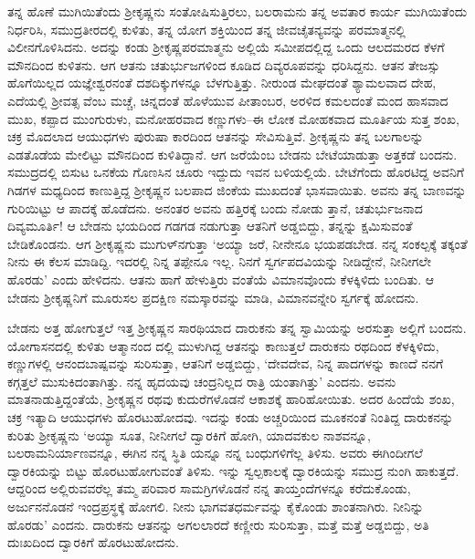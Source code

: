 ತನ್ನ ಹೊಣೆ ಮುಗಿಯಿತೆಂದು ಶ್ರೀಕೃಷ್ಣನು ಸಂತೋಷಿಸುತ್ತಿರಲು, ಬಲರಾಮನು ತನ್ನ ಅವತಾರ ಕಾರ್ಯ ಮುಗಿಯಿತೆಂದು ನಿರ್ಧರಿಸಿ, ಸಮುದ್ರತೀರದಲ್ಲಿ ಕುಳಿತು, ತನ್ನ ಯೋಗ ಶಕ್ತಿಯಿಂದ ತನ್ನ ಜೀವಚೈತನ್ಯವನ್ನು ಪರಮಾತ್ಮನಲ್ಲಿ ವಿಲೀನಗೊಳಿಸಿದನು. ಅದನ್ನು ಕಂಡು ಶ್ರೀಕೃಷ್ಣಪರಮಾತ್ಮನು ಅಲ್ಲಿಯೆ ಸಮೀಪದಲ್ಲಿದ್ದ ಒಂದು ಆಲದಮರದ ಕೆಳಗೆ ಮೌನದಿಂದ ಕುಳಿತನು. ಆಗ ಆತನು ಚತುರ್ಭುಜಗಳಿಂದ ಕೂಡಿದ ದಿವ್ಯರೂಪವನ್ನು ಧರಿಸಿದ್ದನು. ಆತನ ತೇಜಸ್ಸು ಹೊಗೆಯಿಲ್ಲದ ಯಜ್ಞೇಶ್ವರನಂತೆ ದಶದಿಕ್ಕುಗಳನ್ನೂ ಬೆಳಗುತ್ತಿತ್ತು. ನೀರುಂಡ ಮೇಘದಂತೆ ಶ್ಯಾಮಲವಾದ ದೇಹ, ಎದೆಯಲ್ಲಿ ಶ್ರೀವತ್ಸ ವೆಂಬ ಮಚ್ಚೆ, ಚಿನ್ನದಂತೆ ಹೊಳೆಯುವ ಪೀತಾಂಬರ, ಅರಳಿದ ಕಮಲದಂತೆ ಮಂದ ಹಾಸವಾದ ಮುಖ, ಕಪ್ಪಾದ ಮುಂಗುರುಳು, ಮನೋಹರವಾದ ಕಣ್ಣುಗಳು–ಈ ಲೋಕ ಮೋಹಕವಾದ ಮೂರ್ತಿಯ ಸುತ್ತ ಶಂಖ, ಚಕ್ರ ಮೊದಲಾದ ಆಯುಧಗಳು ಪುರುಷಾ ಕಾರದಿಂದ ಆತನನ್ನು ಸೇವಿಸುತ್ತಿವೆ. ಶ್ರೀಕೃಷ್ಣನು ತನ್ನ ಬಲಗಾಲನ್ನು ಎಡತೊಡೆಯ ಮೇಲಿಟ್ಟು ಮೌನದಿಂದ ಕುಳಿತಿದ್ದಾನೆ. ಆಗ ಜರೆಯೆಂಬ ಬೇಡನು ಬೇಟೆಯಾಡುತ್ತಾ ಅತ್ತಕಡೆ ಬಂದನು. ಸಮುದ್ರದಲ್ಲಿ ಬಿಸುಟ ಒನಕೆಯ ಗೊಣಸಿನ ಚೂರು ಇದ್ದುದು ಇವನ ಬಳಿಯಲ್ಲಿಯೆ. ಬೇಟೆಗೆಂದು ಹೊರಟಿದ್ದ ಅವನಿಗೆ ಗಿಡಗಳ ಮಧ್ಯದಿಂದ ಕಾಣುತ್ತಿದ್ದ ಶ್ರೀಕೃಷ್ಣನ ಬಲಪಾದ ಜಿಂಕೆಯ ಮುಖದಂತೆ ಭಾಸವಾಯಿತು. ಅವನು ತನ್ನ ಬಾಣವನ್ನು ಗುರಿಯಿಟ್ಟು ಆ ಪಾದಕ್ಕೆ ಹೊಡೆದನು. ಅನಂತರ ಅವನು ಹತ್ತಿರಕ್ಕೆ ಬಂದು ನೋಡು ತ್ತಾನೆ, ಚತುರ್ಭುಜನಾದ ದಿವ್ಯಮೂರ್ತಿ! ಆ ಬೇಡನು ಭಯದಿಂದ ಗಡಗಡ ನಡುಗುತ್ತಾ ಆತನಿಗೆ ಅಡ್ಡಬಿದ್ದು, ತನ್ನನ್ನು ಕ್ಷಮಿಸುವಂತೆ ಬೇಡಿಕೊಂಡನು. ಆಗ ಶ್ರೀಕೃಷ್ಣನು ಮುಗುಳ್​ನಗುತ್ತಾ ‘ಅಯ್ಯಾ ಜರೆ, ನೀನೇನೂ ಭಯಪಡಬೇಡ. ನನ್ನ ಸಂಕಲ್ಪಕ್ಕೆ ತಕ್ಕಂತೆ ನೀನು ಈ ಕೆಲಸ ಮಾಡಿದ್ದಿ. ಇದರಲ್ಲಿ ನಿನ್ನ ತಪ್ಪೇನೂ ಇಲ್ಲ. ನಿನಗೆ ಸ್ವರ್ಗಪದವಿಯನ್ನು ನೀಡಿದ್ದೇನೆ, ನೀನೀಗಲೇ ಹೊರಡು’ ಎಂದು ಹೇಳಿದನು. ಆತನು ಹಾಗೆ ಹೇಳುತ್ತಿರು ವಂತೆಯೆ ವಿಮಾನವೊಂದು ಕೆಳಕ್ಕಿಳಿದು ಬಂದಿತು. ಆ ಬೇಡನು ಶ್ರೀಕೃಷ್ಣನಿಗೆ ಮೂರುಸಲ ಪ್ರದಕ್ಷಿಣ ನಮಸ್ಕಾರವನ್ನು ಮಾಡಿ, ವಿಮಾನವನ್ನೇರಿ ಸ್ವರ್ಗಕ್ಕೆ ಹೋದನು.

ಬೇಡನು ಅತ್ತ ಹೋಗುತ್ತಲೆ ಇತ್ತ ಶ್ರೀಕೃಷ್ಣನ ಸಾರಥಿಯಾದ ದಾರುಕನು ತನ್ನ ಸ್ವಾಮಿಯನ್ನು ಅರಸುತ್ತಾ ಅಲ್ಲಿಗೆ ಬಂದನು. ಯೋಗಾಸನದಲ್ಲಿ ಕುಳಿತು ಆತ್ಮಾನಂದ ದಲ್ಲಿ ಮುಳುಗಿದ್ದ ಆತನನ್ನು ಕಾಣುತ್ತಲೆ ದಾರುಕನು ರಥದಿಂದ ಕೆಳಕ್ಕಿಳಿದು, ಕಣ್ಣುಗಳಲ್ಲಿ ಆನಂದಬಾಷ್ಪವನ್ನು ಸುರಿಸುತ್ತಾ, ಆತನಿಗೆ ಅಡ್ಡಬಿದ್ದು, ‘ದೇವದೇವ, ನಿನ್ನ ಪಾದಗಳನ್ನು ಕಾಣದೆ ನನಗೆ ಕಗ್ಗತ್ತಲೆ ಮುಸುಕಿದಂತಾಗಿತ್ತು. ನನ್ನ ಹೃದಯವು ಚಂದ್ರನಿಲ್ಲದ ರಾತ್ರಿ ಯಂತಾಗಿತ್ತು’ ಎಂದನು. ಅವನು ಮಾತನಾಡುತ್ತಿದ್ದಂತೆಯೆ, ಶ್ರೀಕೃಷ್ಣನ ರಥವು ಕುದುರೆಗಳೊಡನೆ ಆಕಾಶಕ್ಕೆ ಹಾರಿಹೋಯಿತು. ಅದರ ಹಿಂದೆಯೆ ಶಂಖ, ಚಕ್ರ ಇತ್ಯಾದಿ ಆಯುಧಗಳು ಹೊರಟುಹೋದವು. ಇದನ್ನು ಕಂಡು ಅಚ್ಚರಿಯಿಂದ ಮೂಕನಂತೆ ನಿಂತಿದ್ದ ದಾರುಕನನ್ನು ಕುರಿತು ಶ್ರೀಕೃಷ್ಣನು ‘ಅಯ್ಯಾ ಸೂತ, ನೀನೀಗಲೆ ದ್ವಾರಕಿಗೆ ಹೋಗಿ, ಯಾದವಕುಲ ನಾಶವನ್ನೂ, ಬಲರಾಮನಿರ್ಯಾಣವನ್ನೂ, ಈಗಿನ ನನ್ನ ಸ್ಥಿತಿ ಯನ್ನೂ ನನ್ನ ಬಂಧುಗಳಿಗೆಲ್ಲ ತಿಳಿಸು. ಅವರು ಈಗಿಂದೀಗಲೆ ದ್ವಾರಕಿಯನ್ನು ಬಿಟ್ಟು ಹೊರಟುಹೋಗುವಂತೆ ತಿಳಿಸು. ಇನ್ನು ಸ್ವಲ್ಪಕಾಲಕ್ಕೆ ದ್ವಾರಕಿಯನ್ನು ಸಮುದ್ರ ನುಂಗಿ ಹಾಕುತ್ತದೆ. ಆದ್ದರಿಂದ ಅಲ್ಲಿರುವವರೆಲ್ಲ ತಮ್ಮ ಪರಿವಾರ ಸಾಮಗ್ರಿಗಳೊಡನೆ ನನ್ನ ತಾಯ್ತಂದೆಗಳನ್ನೂ ಕರೆದುಕೊಂಡು, ಅರ್ಜುನನೊಡನೆ ಇಂದ್ರಪ್ರಸ್ಥಕ್ಕೆ ಹೋಗಲಿ. ನೀನು ಭಾಗವತಧರ್ಮವನ್ನು ಕೈಕೊಂಡು ಶಾಂತನಾಗಿರು. ನೀನಿನ್ನು ಹೊರಡು’ ಎಂದನು. ದಾರುಕನು ಆತನನ್ನು ಅಗಲಲಾರದೆ ಕಣ್ಣೀರು ಸುರಿಸುತ್ತಾ, ಮತ್ತೆ ಮತ್ತೆ ಅಡ್ಡಬಿದ್ದು, ಅತಿ ದುಃಖದಿಂದ ದ್ವಾರಕಿಗೆ ಹೊರಟುಹೋದನು.

